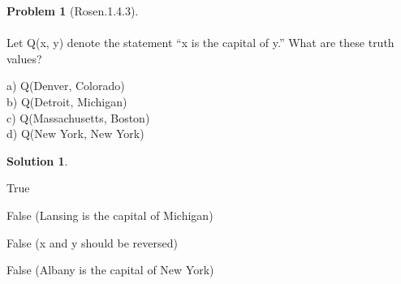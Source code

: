 \documentclass{article}
\theoremstyle{definition}
\newtheorem*{problem}{Problem}
\newtheorem*{solution}{Solution}
\begin{document}
\begin{problem}[Rosen.1.4.3]\ \\
\ \\
Let Q(x, y) denote the statement “x is the capital of y.” What are these truth values?\ \\
\begin{compactenum}
\renewcommand{\theenumi}{\alph{enumi}}
a) Q(Denver, Colorado)\ \\
b) Q(Detroit, Michigan)\ \\
c) Q(Massachusetts, Boston)\ \\
d) Q(New York, New York)\ \\
\end{compactenum}
\end{problem}

\begin{solution}\ \\

\begin{compactenum}
\renewcommand{\theenumi}{\alph{enumi}}  
\item True  
\item False (Lansing is the capital of Michigan)
\item False (x and y should be reversed)
\item False (Albany is the capital of New York)





\end{compactenum}
\end{solution}
\end{document}
